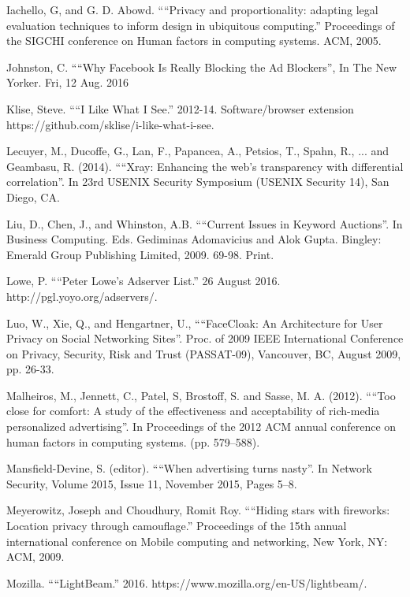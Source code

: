 \documentclass[conference]{IEEEtran}
\begin{document}
\begin{thebibliography}{99}
 Iachello, G, and G. D. Abowd. ““Privacy and proportionality: adapting legal evaluation techniques to inform design in ubiquitous computing.” Proceedings of the SIGCHI conference on Human factors in computing systems. ACM, 2005.

 Johnston, C. ““Why Facebook Is Really Blocking the Ad Blockers”, In The New Yorker. Fri, 12 Aug. 2016

 Klise, Steve. ““I Like What I See.” 2012-14. Software/browser extension https://github.com/sklise/i-like-what-i-see.

 Lecuyer, M., Ducoffe, G., Lan, F., Papancea, A., Petsios, T., Spahn, R., ... and Geambasu, R. (2014). ““Xray: Enhancing the web's transparency with differential correlation”. In 23rd USENIX Security Symposium (USENIX Security 14), San Diego, CA.

 Liu, D., Chen, J., and Whinston, A.B. ““Current Issues in Keyword Auctions”. In Business Computing. Eds. Gediminas Adomavicius and Alok Gupta. Bingley: Emerald Group Publishing Limited, 2009. 69-98. Print.

 Lowe, P. ““Peter Lowe's Adserver List.” 26 August 2016. http://pgl.yoyo.org/adservers/.

 Luo, W., Xie, Q., and Hengartner, U., ““FaceCloak: An Architecture for User Privacy on Social Networking Sites”. Proc. of 2009 IEEE International Conference on Privacy, Security, Risk and Trust (PASSAT-09), Vancouver, BC, August 2009, pp. 26-33.

 Malheiros, M., Jennett, C., Patel, S, Brostoff, S. and Sasse, M. A. (2012). ““Too close for comfort: A study of the effectiveness and acceptability of rich-media personalized advertising”. In Proceedings of the 2012 ACM annual conference on human factors in computing systems. (pp. 579–588).

 Mansfield-Devine, S. (editor). ““When advertising turns nasty”. In Network Security, Volume 2015, Issue 11, November 2015, Pages 5–8.

 Meyerowitz, Joseph and Choudhury, Romit Roy. ““Hiding stars with fireworks: Location privacy through camouflage.” Proceedings of the 15th annual international conference on Mobile computing and networking, New York, NY: ACM, 2009.

 Mozilla. ““LightBeam.” 2016. https://www.mozilla.org/en-US/lightbeam/.


\end{thebibliography}
\end{document}
